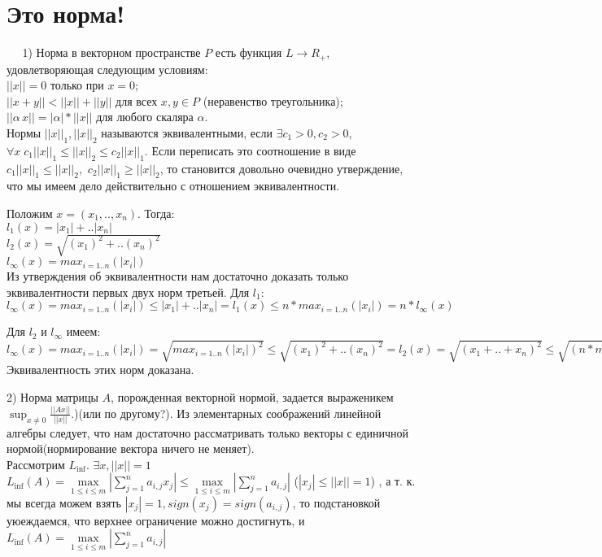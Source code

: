 \documentclass{article}
\begin{document}
\section{Это норма!}

$\; \; \; \; \;$1) Норма в векторном пространстве $P$ есть функция $L \to R_+$, удовлетворяющая следующим условиям: \\
$||x|| = 0$ только при $x = 0$;\\
$||x+y|| < ||x||+||y||$ для всех $x, y \in P$ (неравенство треугольника);\\
$||\alpha\, x||=|\alpha|*||x||$ для любого скаляра $\alpha$.\\

Нормы $||x||_1, ||x||_2$ называются эквивалентными, если 
$\exists c_1 > 0, c_2 > 0$, $\forall x \; c_1||x||_1 \leq ||x||_2 \leq c_2||x||_1 $.
Если переписать это соотношение в виде 
$c_1||x||_1 \leq ||x||_2, $
$c_2||x||_1 \geq ||x||_2 $, то становится довольно очевидно утверждение, что мы имеем дело действительно с отношением эквивалентности. 

Положим $x = (x_1, .. , x_n)$. Тогда: \\
$l_1(x) = |x_1| + .. |x_n|$\\
$l_2(x) = \sqrt{(x_1)^2 + .. (x_n)^2}$\\
$l_\infty(x) = max_{i = 1 .. n}(|x_i|)$\\

Из утверждения об эквивалентности нам достаточно доказать только эквивалентности
первых двух норм третьей. Для $l_1:$\\
$l_\infty(x) = max_{i = 1 .. n}(|x_i|) \leq |x_1| + .. |x_n| = l_1(x) \leq
n*max_{i = 1 .. n}(|x_i|) = n*l_\infty(x)$

Для $l_2$ и $l_\infty$ имеем:\\
$l_\infty(x) = max_{i = 1 .. n}(|x_i|) = \sqrt{max_{i = 1 .. n}(|x_i|)^2} \leq 
\sqrt{(x_1)^2 + .. (x_n)^2} = l_2(x) = \sqrt{(x_1 + .. + x_n)^2} \leq 
\sqrt{(n*max_{i = 1 .. n}(|x_i|))^2} = n*max_{i = 1 .. n}(|x_i|) = n*l_\infty(x)$\\
Эквивалентность этих норм доказана.

2) Норма матрицы $A$, порожденная векторной нормой, задается выраженикем 
$\sup_{x \neq 0}\frac{||Ax||}{||x||}$.)(или по другому?). Из элементарных
соображений линейной алгебры следует, что нам достаточно рассматривать только
векторы с единичной нормой(нормирование вектора ничего не меняет).\\ 

Рассмотрим $L_{\inf}$. $\exists x, ||x|| = 1$
$L_{\inf}(A) = \max\limits_{1\leq i \leq m } \left| \sum\limits_{j = 1}^{n}a_{i, j}x_j\right|  \leq 
\max\limits_{1\leq i \leq m } \left| \sum\limits_{j = 1}^{n}a_{i, j}\right|$
($ |x_j| \leq ||x|| = 1$)
, а т. к. мы всегда можем взять $|x_j| = 1, sign(x_j) = sign(a_{i, j})$, то подстановкой уюеждаемся, что верхнее ограничение можно достигнуть, и 
$L_{\inf}(A) = \max\limits_{1\leq i \leq m } \left| \sum\limits_{j = 1}^{n}a_{i, j}\right|$
\end{document}
